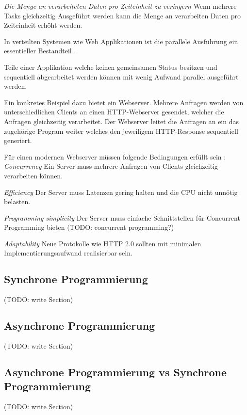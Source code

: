 \emph{Die Menge an verarbeiteten Daten pro Zeiteinheit zu veringern}
	Wenn mehrere Tasks gleichzeitig Ausgeführt werden kann die Menge an verarbeiten Daten pro Zeiteinheit erhöht werden.	

In verteilten Systemen wie Web Applikationen ist die parallele Ausführung ein essentieller Bestandteil \cite[p. 14]{Erb2012}. 

Teile einer Applikation welche keinen gemeinsamen Status besitzen und sequentiell abgearbeitet werden können mit wenig Aufwand parallel ausgeführt werden. \cite[p. 18]{Can08}

Ein konkretes Beispiel dazu bietet ein Webserver. Mehrere Anfragen werden von unterschiedlichen Clients an einen HTTP-Webserver gesendet, welcher die Anfragen gleichzeitig verarbeitet. Der Webserver leitet die Anfragen an ein das zugehörige Program weiter welches den jeweiligem HTTP-Response sequentiell generiert. \cite[p. 18]{Can08}

Für einen modernen Webserver müssen folgende Bedingungen erfüllt sein \cite[p. 2]{Sch97}: 
\label{Webserver_Requirements}
\emph{Concurrency}
	Ein Server muss mehrere Anfragen von Clients gleichzeitig verarbeiten können. 

\emph{Efficiency}
	Der Server muss Latenzen gering halten und die CPU nicht unnötig belasten. 

\emph{Programming simplicity}
	Der Server muss einfache Schnittstellen für Concurrent Programming bieten (TODO: concurrent programming?)

\emph{Adaptability}
	Neue Protokolle wie HTTP 2.0 sollten mit minimalen Implementierungsaufwand realisierbar sein.



\subsection{Synchrone Programmierung}
(TODO: write Section)

\subsection{Asynchrone Programmierung}



(TODO: write Section)

\subsection{Asynchrone Programmierung vs Synchrone Programmierung}
(TODO: write Section)


